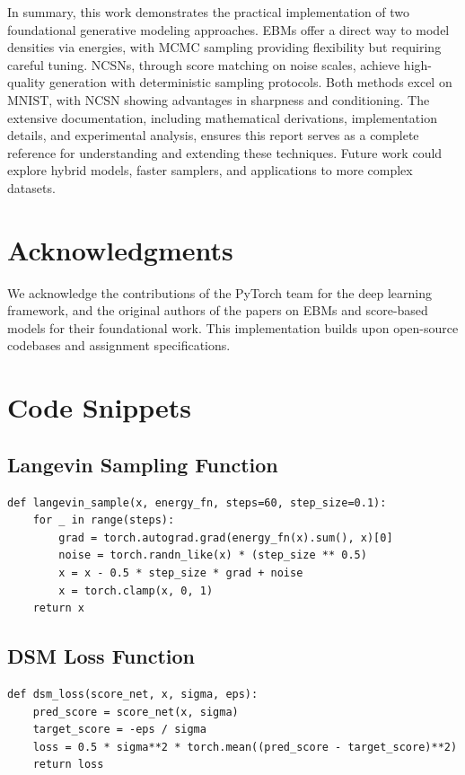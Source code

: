 \documentclass[a4paper,12pt]{article}
\begin{document}
In summary, this work demonstrates the practical implementation of two foundational generative modeling approaches. EBMs offer a direct way to model densities via energies, with MCMC sampling providing flexibility but requiring careful tuning. NCSNs, through score matching on noise scales, achieve high-quality generation with deterministic sampling protocols. Both methods excel on MNIST, with NCSN showing advantages in sharpness and conditioning. The extensive documentation, including mathematical derivations, implementation details, and experimental analysis, ensures this report serves as a complete reference for understanding and extending these techniques. Future work could explore hybrid models, faster samplers, and applications to more complex datasets.

\section{Acknowledgments}
We acknowledge the contributions of the PyTorch team for the deep learning framework, and the original authors of the papers on EBMs and score-based models for their foundational work. This implementation builds upon open-source codebases and assignment specifications.

\appendices

\section{Code Snippets}

\subsection{Langevin Sampling Function}
\begin{verbatim}
def langevin_sample(x, energy_fn, steps=60, step_size=0.1):
    for _ in range(steps):
        grad = torch.autograd.grad(energy_fn(x).sum(), x)[0]
        noise = torch.randn_like(x) * (step_size ** 0.5)
        x = x - 0.5 * step_size * grad + noise
        x = torch.clamp(x, 0, 1)
    return x
\end{verbatim}

\subsection{DSM Loss Function}
\begin{verbatim}
def dsm_loss(score_net, x, sigma, eps):
    pred_score = score_net(x, sigma)
    target_score = -eps / sigma
    loss = 0.5 * sigma**2 * torch.mean((pred_score - target_score)**2)
    return loss
\end{verbatim}
\end{document}

